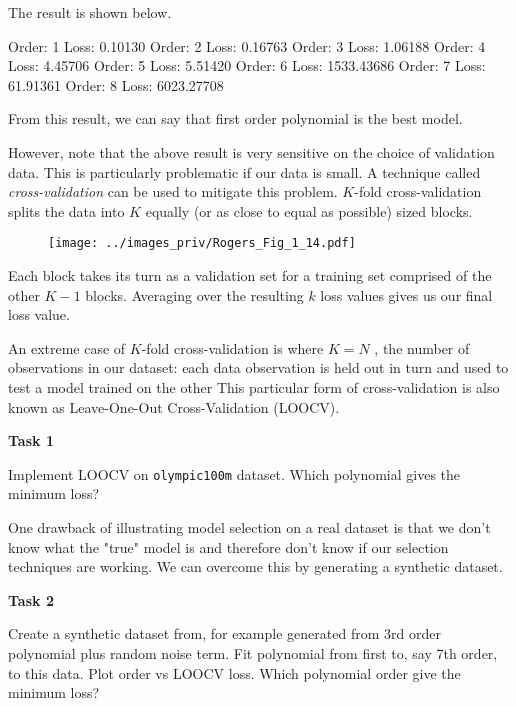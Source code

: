 \documentclass[a4paper,11pt]{article} %
\newcommand{\txtinline}[1]{\texttt{#1}}
\begin{document}
The result is shown below.
\begin{textcode}
Order:   1 Loss:    0.10130
Order:   2 Loss:    0.16763
Order:   3 Loss:    1.06188
Order:   4 Loss:    4.45706
Order:   5 Loss:    5.51420
Order:   6 Loss: 1533.43686
Order:   7 Loss:   61.91361
Order:   8 Loss: 6023.27708    
\end{textcode}
From this result, we can say that first order polynomial is the best model.

However, note that the above result is very sensitive on the choice of validation data.
This is particularly problematic if our data is small.
A technique called \emph{cross-validation} can be used to mitigate this problem.
$K$-fold cross-validation splits the data into $K$ equally (or as close to equal as
possible) sized blocks.

\begin{figure}[H]
\begin{center}
\texttt{[image: ../images\_priv/Rogers\_Fig\_1\_14.pdf]}
\end{center}
\end{figure}

Each block takes its turn as a
validation set for a training set comprised of the other $K−1$ blocks. Averaging over
the resulting $k$ loss values gives us our final loss value.

An extreme case of $K$-fold
cross-validation is where $K=N$ , the number of observations in our dataset: each
data observation is held out in turn and used to test a model trained on the other
This particular form of cross-validation is also known as Leave-One-Out
Cross-Validation (LOOCV).

\begin{mdframed}
\textbf{Task 1}

Implement LOOCV on \txtinline{olympic100m} dataset. Which polynomial gives the
minimum loss?
\end{mdframed}

One drawback of illustrating model selection on a real dataset is that we don’t
know what the "true" model is and therefore don’t know if our selection techniques
are working. We can overcome this by generating a synthetic dataset.

\begin{mdframed}
\textbf{Task 2}

Create a synthetic dataset from, for example generated from 3rd order
polynomial plus random noise term. Fit polynomial from first to, say 7th order,
to this data. Plot order vs LOOCV loss. Which polynomial order give the minimum loss?
\end{mdframed}
\end{document}

